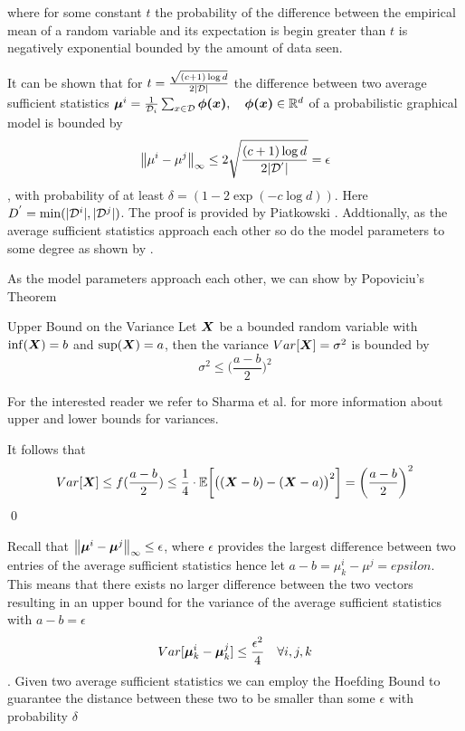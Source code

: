 where for some constant $t$ the probability of the difference between the empirical mean of a random variable and its expectation is begin greater than $t$ is negatively exponential bounded by the amount of data seen.

It can be shown that for $t = \frac{\sqrt{(c+1) \log d}}{2\lvert\mathcal{D}\rvert}$ the difference between two average sufficient statistics $\boldsymbol{\mu}^i = \frac{1}{\mathcal{D}_i} \sum_{x \in \mathcal{D}} \boldsymbol{\phi(x)}, \quad \boldsymbol{\phi(x)} \in \mathbb{R}^d$ of a probabilistic graphical model is bounded by
\begin{equation}
    \left\lVert\mu^{i} -  \mu^{j}\right\rVert_\infty \leq 2 \sqrt{
        \frac{(c+1) \log d}
        {2\lvert\mathcal{D^{'}}\rvert}
        } = \epsilon
\end{equation},
with probability of at least $\delta= (1- 2 \exp(-c \log d))$. Here $D^{'} = \min(\lvert\mathcal{D}^i\rvert, \lvert\mathcal{D}^j\rvert)$.
The proof is provided by Piatkowski \cite{piatkowski2019distributed}. 
Addtionally, as the average sufficient statistics approach each other so do the model parameters to some degree as shown by .

As the model parameters approach each other, we can show by Popoviciu's Theorem \cite{popoviciu1935equations} 
\begin{threm}{Upper Bound on the Variance}
    Let $\boldsymbol{X}$ be a bounded random variable with $\inf(\boldsymbol{X}) = b$ and $\sup(\boldsymbol{X}) = a$, 
    then the variance $Var[\boldsymbol{X}] = \sigma^2$ is bounded by 
    \begin{equation}
        \sigma^2 \leq \bigg(\frac{a-b}{2}\bigg)^{2}
    \end{equation}
\end{threm}

For the interested reader we refer to Sharma et al. \cite{sharma2010betterbounds} for more information about upper and lower bounds for variances.



It follows that
\begin{equation*}
    Var[\boldsymbol{X}] \leq f(\frac{a-b}{2}) \leq  \frac{1}{4} \cdot \mathbb{E}\bigg[\big((\boldsymbol{X} - b) - (\boldsymbol{X} - a)\big)^2\bigg]  =  \bigg(\frac{a-b}{2}\bigg)^2 
\end{equation*}\qed

Recall that $\left\lVert\boldsymbol{\mu}^{i} -  \boldsymbol{\mu}^{j}\right\rVert_\infty \leq  \epsilon$, where $\epsilon$ provides the largest difference between two entries of the average sufficient statistics hence let $a - b = \mu^{i}_k - \mu^{j} = epsilon$.
This means that there exists no larger difference between the two vectors resulting in an upper bound for the variance of the average sufficient statistics with $a - b = \epsilon$ 
\begin{equation*}
    Var[\boldsymbol{\mu}^{i}_k -  \boldsymbol{\mu}^{j}_k] \leq \frac{\epsilon^2}{4} \quad \forall i,j,k
\end{equation*}.
Given two average sufficient statistics we can employ the Hoefding Bound to guarantee the distance between these two to be smaller than some $\epsilon$ with probability $\delta$


